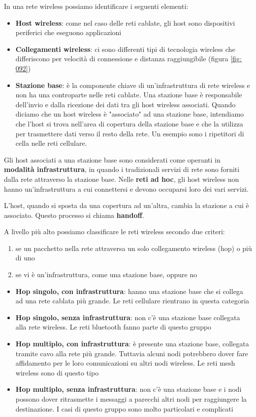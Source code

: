 \documentclass[11pt,a4paper]{book}
\begin{document}
In una rete wireless possiamo identificare i seguenti elementi: 
\begin{itemize}
	\item \textbf{Host wireless}: come nel caso delle reti cablate, gli host sono dispositivi periferici che eseguono applicazioni
	\item \textbf{Collegamenti wireless}: ci sono differenti tipi di tecnologia wireless che differiscono per velocità di connessione e distanza raggiungibile (figura \ref{fig: 092})
	\item \textbf{Stazione base}: è la componente chiave di un'infrastruttura di rete wireless e non ha una controparte nelle reti cablate. Una stazione base è responsabile dell'invio e dalla ricezione dei dati tra gli host wireless associati. Quando diciamo che un host wireless è "associato" ad una stazione base, intendiamo che l'host si trova nell'area di copertura della stazione base e che la utilizza per trasmettere dati verso il resto della rete. Un esempio sono i ripetitori di cella nelle reti cellulare. 
\end{itemize}

Gli host associati a una stazione base sono considerati come operanti in \textbf{modalità infrastruttura}, in quando i tradizionali servizi di rete sono forniti dalla rete attraverso la stazione base. Nelle \textbf{reti ad hoc}, gli host wireless non hanno un'infrastruttura a cui connettersi e devono occuparsi loro dei vari servizi.

L'host, quando si sposta da una copertura ad un'altra, cambia la stazione a cui è associato. Questo processo si chiama \textbf{handoff}.

A livello più alto possiamo classificare le reti wireless secondo due criteri:
\begin{enumerate}
	\item se un pacchetto nella rete attraversa un solo collegamento wireless (hop) o più di uno
	\item se vi è un'infrastruttura, come una stazione base, oppure no
\end{enumerate}

\begin{itemize}
	\item \textbf{Hop singolo, con infrastruttura}: hanno una stazione base che si collega ad una rete cablata più grande. Le reti cellulare rientrano in questa categoria
	\item \textbf{Hop singolo, senza infrastruttura}: non c'è una stazione base collegata alla rete wireless. Le reti bluetooth fanno parte di questo gruppo
	\item \textbf{Hop multiplo, con infrastruttura}: è presente una stazione base, collegata tramite cavo alla rete più grande. Tuttavia alcuni nodi potrebbero dover fare affidamento per le loro comunicazioni su altri nodi wireless. Le reti mesh wireless sono di questo tipo
	\item \textbf{Hop multiplo, senza infrastruttura}: non c'è una stazione base e i nodi possono dover ritrasmette i messaggi a parecchi altri nodi per raggiungere la destinazione.  I casi di questo gruppo sono molto particolari e complicati
\end{itemize}
\end{document}
